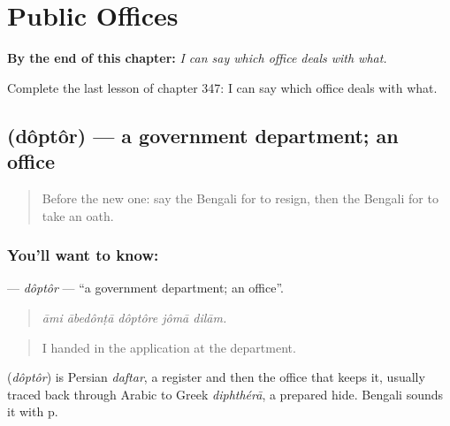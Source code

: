 
\chapter{Public Offices}
\label{ch:bn-public-offices}

\begin{chapteropening}
\textbf{By the end of this chapter:} \emph{I can say which office deals with what.}

Complete the last lesson of chapter 347: I can say which office deals with what.
\end{chapteropening}

\section[\texorpdfstring{\bn{দপ্তর} (dôptôr)}{দপ্তর (dôptôr)}]{ (dôptôr) — a government department; an office}

\label{lesson:BN-C347-doptor}



\begin{quote}
Before the new one: say the Bengali for to resign, then the Bengali for to take an oath.
\end{quote}

\subsection*{You'll want to know: }
\textbf{} — \emph{dôptôr} — \textquotedblleft{}a government department; an office\textquotedblright{}.

\begin{quote}
    
\end{quote}

\begin{quote}
\emph{āmi ābedônṭā dôptôre jômā dilām.}
\end{quote}

\begin{quote}
I handed in the application at the department.
\end{quote}

\begin{cousinweb}
\textbf{} (\emph{dôptôr}) is Persian \emph{daftar}, a register and then the office that keeps it, usually traced back through Arabic to Greek \emph{diphthérā}, a prepared hide. Bengali sounds it with p.
\end{cousinweb}

